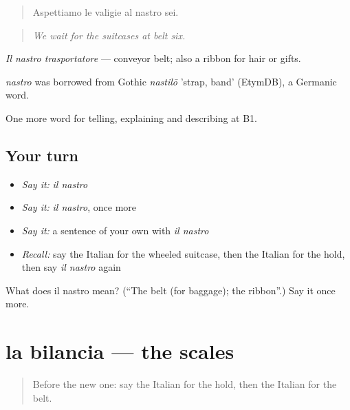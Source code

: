 \begin{quote}
Aspettiamo le valigie al nastro sei.
\end{quote}

\begin{quote}
\emph{We wait for the suitcases at belt six.}
\end{quote}

\emph{Il nastro trasportatore} — conveyor belt; also a ribbon for hair or gifts.

\begin{cousinweb}
\emph{nastro} was borrowed from Gothic \emph{nastilō} 'strap, band' (EtymDB), a Germanic word.
\end{cousinweb}

\begin{grammarlens}[title={What you've built}]
One more word for telling, explaining and describing at B1.
\end{grammarlens}

\subsection*{Your turn}
\begin{itemize}
\raggedright
  \item \emph{Say it:} \emph{il nastro}
  \item \emph{Say it:} \emph{il nastro}, once more
  \item \emph{Say it:} a sentence of your own with \emph{il nastro}
  \item \emph{Recall:} say the Italian for the wheeled suitcase, then the Italian for the hold, then say \emph{il nastro} again
\end{itemize}

\begin{tcolorbox}[breakable,colback=teal!4,colframe=teal!35!black,title={Before you move on}]
What does il nastro mean? (\textquotedblleft{}The belt (for baggage); the ribbon\textquotedblright{}.) Say it once more.
\end{tcolorbox}
\section[la bilancia]{la bilancia — the scales}

\label{lesson:IT-C426-bilancia}



\begin{quote}
Before the new one: say the Italian for the hold, then the Italian for the belt.
\end{quote}

